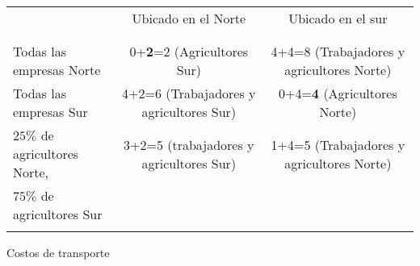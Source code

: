 \begin{center}
    \begin{tabular}{lcc}
	& Ubicado en el Norte & Ubicado en el sur \\\\
	\hline\\
	Todas las empresas Norte & 0+\textbf{2}=2 (Agricultores Sur) & 4+4=8 (Trabajadores y agricultores Norte)\\
	Todas las empresas Sur &4+2=6 (Trabajadores y agricultores Sur)& 0+4=\textbf{4} (Agricultores Norte)\\
	$25\%$ de agricultores Norte, & 3+2=5 (trabajadores y agricultores Sur) & 1+4=5 (Trabajadores y agricultores Norte)\\
	$75\%$ de agricultores Sur & &  \\
	\hline\\
    \end{tabular}
    Costos de transporte
\end{center}
\vspace{.5cm}

